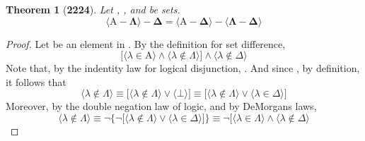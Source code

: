 \documentclass[preview]{standalone}
\newtheorem*{theorem*}{Theorem}
\begin{document}
\begin{theorem*}[\textbf{2224}] \color{black}
    Let , \bm{$\Lambda$}, and \bm{$\Delta$} be sets. 
    \begin{equation*}
        \bm{
            \Big \langle \mathrm{A} - \Lambda \Big \rangle - \Delta 
                = 
            \Big \langle \mathrm{A} - \Delta \Big \rangle 
                - 
            \Big \langle \Lambda - \Delta \Big \rangle
        }
    \end{equation*}
\end{theorem*}
\begin{proof} \color{black}
    Let \bm{$\lambda$} be an element in 
    . 
    By the definition for set difference,
    \begin{equation*}
        \bigg[
            \Big \langle \lambda \in \mathrm{A} \Big \rangle
                \land
            \Big \langle \lambda \notin \Lambda \Big \rangle
        \bigg]
            \land
        \Big \langle \lambda \notin \Delta \Big \rangle
    \end{equation*}
    Note that, by the indentity law for logical disjunction, 
    \bm{$
    \lambda \notin \Lambda
        \equiv 
    \lambda \notin \Lambda
        \lor 
    \bot
    $}.
    And since
    \bm{$
    \lambda \in \Delta
        \equiv 
    \bot
    $},
    by definition,
    it follows that
    \begin{equation*}
        \Big \langle \lambda \notin \Lambda \Big \rangle
            \equiv
        \bigg[
            \Big \langle \lambda \notin \Lambda \Big \rangle
                \lor
            \Big \langle \bot \Big \rangle
        \bigg]
            \equiv
        \bigg[
            \Big \langle \lambda \notin \Lambda \Big \rangle
                \lor
            \Big \langle \lambda \in \Delta \Big \rangle
        \bigg]
    \end{equation*}
    Moreover, by the double negation law of logic, and by DeMorgans laws,
    \begin{equation*}
        \Big \langle \lambda \notin \Lambda \Big \rangle
            \equiv
        \lnot \Bigg\{
            \lnot \bigg[
                \Big \langle \lambda \notin \Lambda \Big \rangle
                    \lor
                \Big \langle \lambda \in \Delta \Big \rangle
            \bigg]
        \Bigg\}
            \equiv
        \lnot \bigg[
            \Big \langle \lambda \in \Lambda \Big \rangle
                \land
            \Big \langle \lambda \notin \Delta \Big \rangle

\end{equation*}
\end{proof}
\end{document}

